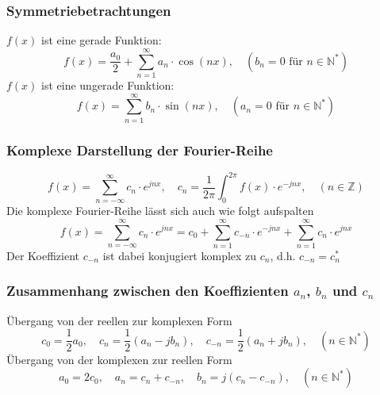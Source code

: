 \subsubsection{Symmetriebetrachtungen}
$f\left(x\right)$ ist eine gerade Funktion:
\begin{equation}
\boxed{f\left(x\right)=\dfrac{a_0}{2}+\displaystyle \sum_{n=1}^{\infty}a_n\cdot \cos\left(nx\right),\quad \left(b_n=0\text{ für } n\in \mathbb{N}^*\right)}
\end{equation}
$f\left(x\right)$ ist eine ungerade Funktion:
\begin{equation}
\boxed{f\left(x\right)=\displaystyle \sum_{n=1}^{\infty}b_n\cdot \sin\left(nx\right),\quad \left(a_n=0\text{ für } n\in \mathbb{N}^*\right)}
\end{equation}
\subsubsection{Komplexe Darstellung der Fourier-Reihe}
\begin{equation}
\boxed{f\left(x\right)=\displaystyle \sum_{n=-\infty}^{\infty}c_n\cdot e^{jnx},\quad c_n=\dfrac{1}{2\pi}\displaystyle \int_{0}^{2\pi}f\left(x\right)\cdot e^{-jnx},\quad \left(n\in \mathbb{Z}\right)}
\end{equation}
Die komplexe Fourier-Reihe lässt sich auch wie folgt aufspalten
\begin{equation}
\boxed{f\left(x\right)=\displaystyle \sum_{n=-\infty}^{\infty}c_n\cdot e^{jnx}=c_0+\displaystyle \sum_{n=1}^\infty c_{-n}\cdot e^{-jnx}+\displaystyle \sum_{n=1}^{\infty}c_n\cdot e^{jnx}}
\end{equation}
Der Koeffizient $c_{-n}$ ist dabei konjugiert komplex zu $c_n$, d.h. $c_{-n}=c_n^*$
\subsubsection{Zusammenhang zwischen den Koeffizienten $a_n$, $b_n$ und $c_n$}
Übergang von der reellen zur komplexen Form
\begin{equation}
\boxed{c_0=\dfrac{1}{2}a_0,\quad c_n=\dfrac{1}{2}\left(a_n-jb_n\right),\quad c_{-n}=\dfrac{1}{2}\left(a_n+jb_n\right),\quad \left(n\in \mathbb{N}^*\right)}
\end{equation}
Übergang von der komplexen zur reellen Form
\begin{equation}
\boxed{a_0=2c_0,\quad a_n=c_n+c_{-n},\quad b_{n}=j\left(c_n-c_{-n}\right),\quad \left(n\in \mathbb{N}^*\right)}
\end{equation}
